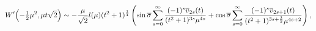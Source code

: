 \[\mathop{W\/}\nolimits'\!\left(-\tfrac{1}{2}\mu^{2},\mu t\sqrt{2}\right)\sim-%
\frac{\mu}{\sqrt{2}}l(\mu)(t^{2}+1)^{\frac{1}{4}}\left(\mathop{\sin\/}%
\nolimits\overline{\sigma}\sum_{s=0}^{\infty}\frac{(-1)^{s}\overline{v}_{2s}(t%
)}{(t^{2}+1)^{3s}\mu^{4s}}+\mathop{\cos\/}\nolimits\overline{\sigma}\sum_{s=0}%
^{\infty}\frac{(-1)^{s}\overline{v}_{2s+1}(t)}{(t^{2}+1)^{3s+\frac{3}{2}}\mu^{%
4s+2}}\right),\]